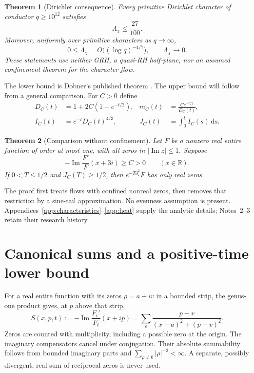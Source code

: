 \documentclass[11pt]{article}
\newtheorem{theorem}{Theorem}[section]
\theoremstyle{remark}\newtheorem{remark}[theorem]{Remark}
\newcommand{\Ima}{\operatorname{Im}}
\newcommand{\dd}{\mathrm{d}}
\begin{document}
\begin{theorem}[Dirichlet consequence]\label{thm:dirichlet}
Every primitive Dirichlet character of conductor $q\ge10^{12}$ satisfies
\[\Lambda_\chi\le\frac{27}{100}.\]
Moreover, uniformly over primitive characters as $q\to\infty$,
\[0\le\Lambda_\chi=O\bigl((\log q)^{-4/7}\bigr),\qquad
\Lambda_\chi\longrightarrow0.\]
These statements use neither GRH, a quasi-RH half-plane, nor an assumed
confinement theorem for the character flow.
\end{theorem}

The lower bound is Dobner's published theorem \cite{dobner}. The upper
bound will follow from a general comparison. For $C>0$ define
\begin{align}
 D_C(t)&=1+2C(1-e^{-t/2}),&
 m_C(t)&=\frac{Ce^{-t/2}}{D_C(t)},\label{eq:dm}\\
 I_C(t)&=e^{-t}D_C(t)^{4/3},&
 J_C(t)&=\int_0^t I_C(s)\,\dd s.\label{eq:ij}
\end{align}

\begin{theorem}[Comparison without confinement]\label{thm:general}
Let $F$ be a nonzero real entire function of order at most one, with all
zeros in $|\Ima z|\le1$. Suppose
\[ -\Ima\frac{F'}F(x+3i)\ge C>0\qquad(x\in\mathbb R). \]
If $0<T\le1/2$ and $J_C(T)\ge1/2$, then
$e^{-T\partial_z^2}F$ has only real zeros.
\end{theorem}

The proof first treats flows with confined nonreal zeros, then removes
that restriction by a sine-tail approximation. No evenness assumption is
present. Appendices~\ref{app:characteristics}--\ref{app:heat} supply the analytic
details; Notes~2--3 \cite{note2,note3} retain their research history.

\section{Canonical sums and a positive-time lower bound}
For a real entire function with its zeros $\rho=a+iv$ in a bounded strip,
the genus-one product gives, at $p$ above that strip,
\begin{equation}
 S(x,p,t):=-\Ima\frac{F_t'}{F_t}(x+ip)
 =\sum_\rho\frac{p-v}{(x-a)^2+(p-v)^2}.\label{eq:poisson}
\end{equation}
Zeros are counted with multiplicity, including a possible zero at the
origin. The imaginary compensators cancel under conjugation. Their
absolute summability follows from bounded imaginary parts and
$\sum_{\rho\ne0}|\rho|^{-2}<\infty$. A separate, possibly divergent,
real sum of reciprocal zeros is never used.
\end{document}
